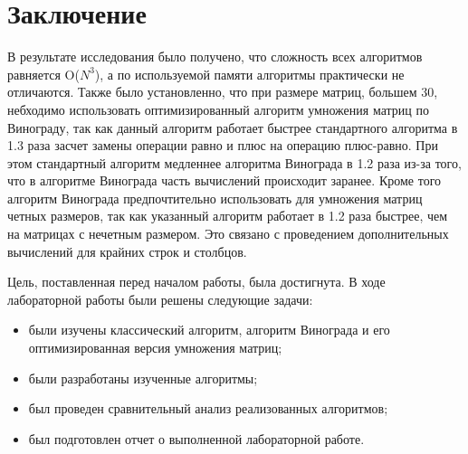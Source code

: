 \chapter*{Заключение}

В результате исследования было получено, что сложность всех алгоритмов равняется O($N^{3}$), а по используемой памяти алгоритмы практически не отличаются.
Также было установленно, что при размере матриц, большем 30, небходимо использовать оптимизированный алгоритм умножения матриц по Винограду, так как данный алгоритм работает быстрее стандартного алгоритма в 1.3 раза засчет замены операции равно и плюс на операцию плюс-равно. При этом стандартный алгоритм медленнее алгоритма Винограда в 1.2 раза из-за того, что в алгоритме Винограда часть вычислений происходит заранее. 
Кроме того алгоритм Винограда предпочтительно использовать для умножения матриц четных размеров, так как указанный алгоритм работает в 1.2 раза быстрее, чем на матрицах с нечетным размером. Это связано с проведением дополнительных вычислений для крайних строк и столбцов.

Цель, поставленная перед началом работы, была достигнута. В ходе лабораторной работы были решены следующие задачи:

\begin{itemize}
	\item были изучены классический алгоритм, алгоритм Винограда и его оптимизированная версия умножения матриц;
	\item были разработаны изученные алгоритмы;
	\item был проведен сравнительный анализ реализованных алгоритмов;
	\item был подготовлен отчет о выполненной лабораторной работе.
\end{itemize}

